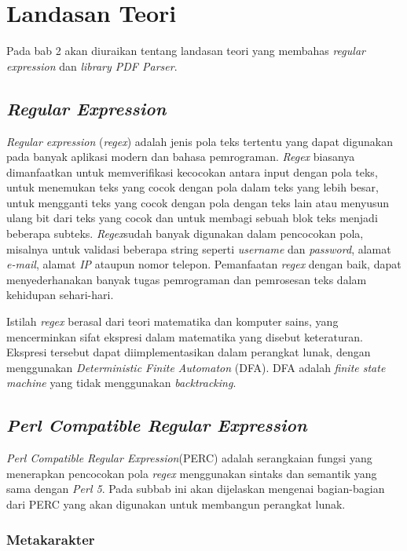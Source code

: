 \chapter{Landasan Teori}
\label{chap:teori}

Pada bab 2 akan diuraikan tentang landasan teori yang membahas \textit{regular expression} dan \textit{library PDF Parser}.

\section{\textit{Regular Expression}}
\label{sec:regex} 
 
\textit{Regular expression} (\textit{regex}) adalah jenis pola teks tertentu yang dapat digunakan pada banyak aplikasi modern dan bahasa pemrograman. \textit{Regex} biasanya dimanfaatkan untuk memverifikasi kecocokan antara input dengan pola teks, untuk menemukan teks yang cocok dengan pola dalam teks yang lebih besar, untuk mengganti teks yang cocok dengan pola dengan teks lain atau menyusun ulang bit dari teks yang cocok dan untuk membagi sebuah blok teks menjadi beberapa subteks. \textit{Regex}sudah banyak digunakan dalam pencocokan pola, misalnya untuk validasi beberapa string seperti \textit{username} dan \textit{password}, alamat \textit{e-mail}, alamat \textit{IP} ataupun nomor telepon. Pemanfaatan \textit{regex} dengan baik, dapat menyederhanakan banyak tugas pemrograman dan pemrosesan teks dalam kehidupan sehari-hari.

Istilah \textit{regex} berasal dari teori matematika dan komputer sains, yang mencerminkan sifat ekspresi dalam matematika yang disebut keteraturan. Ekspresi tersebut dapat diimplementasikan dalam perangkat lunak, dengan menggunakan \textit{Deterministic Finite Automaton} (DFA). DFA adalah \textit{finite state machine} yang tidak menggunakan \textit{backtracking}.

\section{\textit{Perl Compatible Regular Expression}}
\label{sec:perc}

\textit{Perl Compatible Regular Expression}(PERC) adalah serangkaian fungsi yang menerapkan pencocokan pola \textit{regex} menggunakan sintaks dan semantik yang sama dengan \textit{Perl 5}. Pada subbab ini akan dijelaskan mengenai bagian-bagian dari PERC yang akan digunakan untuk membangun perangkat lunak.

\subsection{Metakarakter}

